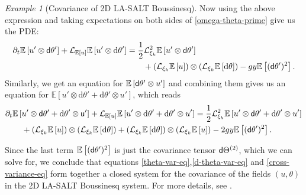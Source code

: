 \documentclass[11pt, oneside]{article}   	%
\numberwithin{equation}{section}
\theoremstyle{plain}
\theoremstyle{definition}
\theoremstyle{remark}
\newtheorem{example}{Example}
\newcommand{\<}{\langle}
\renewcommand{\>}{\rangle}
\def\rmd{{\mathrm{d}}}
\newcommand{\E}[1]{\mathbb{E}\left[{#1}\right]}
\begin{document}
\begin{example}[Covariance of 2D LA-SALT Boussinesq]
Now using the above expression and taking expectations on both sides of \eqref{omega-theta-prime} give us the PDE:
\begin{align*}
    \begin{split}
   \partial_{t} \E{u' \otimes \sf d\theta'} + \mathcal L_{\E{u}}\E{u' \otimes {\rmd}\theta'}
    &= \frac12 \mathcal L_{\xi_k}^2 \E{u' \otimes  {\sf{d}}\theta'} \\
    &\qquad + \left(\mathcal L_{\xi_k} \E{u}\right) \otimes \left(\mathcal L_{\xi_k} \E{{\rmd} \theta}\right) - gy\E{({\sf{d}}\theta')^2}.
    \end{split}
\end{align*}
Similarly, we get an equation for $\E{{\sf{d}}\theta' \otimes u'}$ and combining them gives us an equation for $\E{u' \otimes {\rmd} \theta' + {\rmd} \theta' \otimes u'}$, which reads
\begin{align}\label{cross-variance-eq}
    \begin{split}
    &\partial_{t} \E{u' \otimes \sf d\theta' + {\rmd} \theta' \otimes u'} + \mathcal L_{\E{u}}\E{u' \otimes {\rmd}\theta' + {\rmd} \theta' \otimes u'}
    = \frac12 \mathcal L_{\xi_k}^2 \E{u' \otimes  {\sf{d}}\theta' + {\rmd} \theta' \otimes u'} \\
    &\qquad + \left(\mathcal L_{\xi_k} \E{u}\right) \otimes \left(\mathcal L_{\xi_k} \E{{\rmd} \theta}\right) + \left(\mathcal L_{\xi_k} \E{{\rmd} \theta}\right) \otimes \left(\mathcal L_{\xi_k} \E{u}\right) - 2gy\E{({\sf{d}}\theta')^2}.
    \end{split}
\end{align}

Since the last term  $\E{({\sf{d}}\theta')^2}$ is just the covariance tensor ${\sf{d}}\Theta^{(2)}$, which we can solve for, we conclude that equations \eqref{theta-var-eq},\eqref{d-theta-var-eq} and \eqref{cross-variance-eq} form together a closed system for the covariance of the fields $(u, \theta)$ in the 2D LA-SALT Boussinesq system. For more details, see \cite{DieAytJNLS}.
\end{example}
\color{black}
\end{document}
